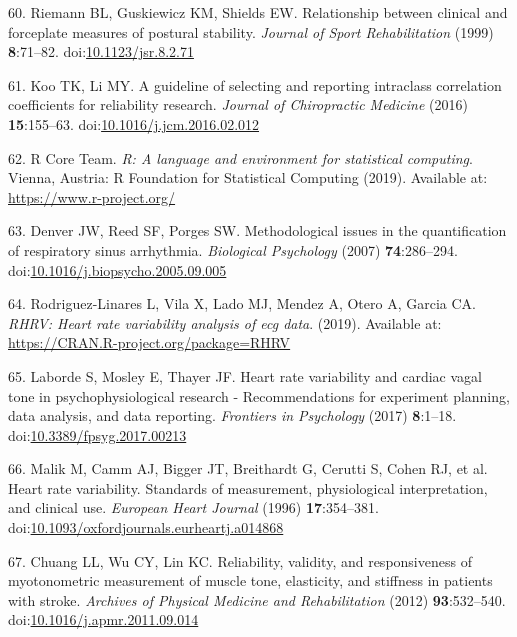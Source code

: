 \documentclass[
  english,
  man]{apa6}
\newenvironment{cslreferences}%
  {}%
  {\par}
\begin{document}
\begin{cslreferences}
\leavevmode\hypertarget{ref-Riemann1999d}{}%
60. Riemann BL, Guskiewicz KM, Shields EW. Relationship between clinical and forceplate measures of postural stability. \emph{Journal of Sport Rehabilitation} (1999) \textbf{8}:71--82. doi:\href{https://doi.org/10.1123/jsr.8.2.71}{10.1123/jsr.8.2.71}

\leavevmode\hypertarget{ref-Koo2016}{}%
61. Koo TK, Li MY. A guideline of selecting and reporting intraclass correlation coefficients for reliability research. \emph{Journal of Chiropractic Medicine} (2016) \textbf{15}:155--63. doi:\href{https://doi.org/10.1016/j.jcm.2016.02.012}{10.1016/j.jcm.2016.02.012}

\leavevmode\hypertarget{ref-RCoreTeam2019}{}%
62. R Core Team. \emph{R: A language and environment for statistical computing}. Vienna, Austria: R Foundation for Statistical Computing (2019). Available at: \url{https://www.r-project.org/}

\leavevmode\hypertarget{ref-Denver2007}{}%
63. Denver JW, Reed SF, Porges SW. Methodological issues in the quantification of respiratory sinus arrhythmia. \emph{Biological Psychology} (2007) \textbf{74}:286--294. doi:\href{https://doi.org/10.1016/j.biopsycho.2005.09.005}{10.1016/j.biopsycho.2005.09.005}

\leavevmode\hypertarget{ref-Rodriguez-Linares2017}{}%
64. Rodriguez-Linares L, Vila X, Lado MJ, Mendez A, Otero A, Garcia CA. \emph{RHRV: Heart rate variability analysis of ecg data}. (2019). Available at: \url{https://CRAN.R-project.org/package=RHRV}

\leavevmode\hypertarget{ref-Laborde2017}{}%
65. Laborde S, Mosley E, Thayer JF. Heart rate variability and cardiac vagal tone in psychophysiological research - Recommendations for experiment planning, data analysis, and data reporting. \emph{Frontiers in Psychology} (2017) \textbf{8}:1--18. doi:\href{https://doi.org/10.3389/fpsyg.2017.00213}{10.3389/fpsyg.2017.00213}

\leavevmode\hypertarget{ref-Malik1996}{}%
66. Malik M, Camm AJ, Bigger JT, Breithardt G, Cerutti S, Cohen RJ, et al. Heart rate variability. Standards of measurement, physiological interpretation, and clinical use. \emph{European Heart Journal} (1996) \textbf{17}:354--381. doi:\href{https://doi.org/10.1093/oxfordjournals.eurheartj.a014868}{10.1093/oxfordjournals.eurheartj.a014868}

\leavevmode\hypertarget{ref-Chuang2012}{}%
67. Chuang LL, Wu CY, Lin KC. Reliability, validity, and responsiveness of myotonometric measurement of muscle tone, elasticity, and stiffness in patients with stroke. \emph{Archives of Physical Medicine and Rehabilitation} (2012) \textbf{93}:532--540. doi:\href{https://doi.org/10.1016/j.apmr.2011.09.014}{10.1016/j.apmr.2011.09.014}


\end{cslreferences}
\end{document}
